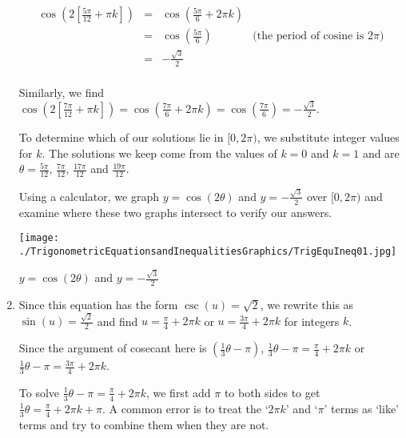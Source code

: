 \documentclass{ximera}
\begin{document}
\begin{example}
\begin{enumerate}
\[ \begin{array}{rclr}

\cos\left( 2\left[\frac{5\pi}{12} + \pi k\right]\right) &  = &  \cos\left(\frac{5\pi}{6} + 2\pi k\right) & \\ [3pt]
																												& =  &   \cos\left(\frac{5\pi}{6}\right) & \text{(the period of cosine is $2\pi$)} \\ [3pt]
																												& =  & -\frac{\sqrt{3}}{2} & \\
\end{array}\] 

Similarly, we find $\cos\left( 2\left[\frac{7\pi}{12} + \pi k\right]\right) = \cos\left(\frac{7\pi}{6} + 2\pi k\right) = \cos\left(\frac{7\pi}{6}\right) = -\frac{\sqrt{3}}{2}$.  

\smallskip

To determine which of our solutions lie in $[0,2\pi)$, we substitute integer values for $k$.  The solutions we keep come from the values of $k = 0$ and $k =1$ and are  $\theta = \frac{5\pi}{12}$,  $\frac{7\pi}{12}$, $\frac{17\pi}{12}$ and $\frac{19\pi}{12}$.  

\smallskip

Using a calculator, we graph $y = \cos(2\theta)$ and $y = -\frac{\sqrt{3}}{2}$ over $[0,2\pi)$ and examine where these two graphs intersect to verify our answers.

\begin{center}

\texttt{[image: ./TrigonometricEquationsandInequalitiesGraphics/TrigEquIneq01.jpg]}

{\boldmath $y = \cos(2\theta)$} and $y=-\frac{\sqrt{3}}{2}$

\end{center}


\item  Since this equation has the form $\csc(u) = \sqrt{2}$, we rewrite this as $\sin(u) = \frac{\sqrt{2}}{2}$ and find $u = \frac{\pi}{4} + 2\pi k$ or $u = \frac{3\pi}{4} + 2\pi  k$ for integers $k$.  

\smallskip

Since the argument of cosecant here is $\left(\frac{1}{3}\theta-\pi \right)$,  $\frac{1}{3}\theta-\pi = \frac{\pi}{4} + 2\pi k$ or $\frac{1}{3}\theta - \pi = \frac{3\pi}{4} + 2\pi k$.

\smallskip

To solve $\frac{1}{3} \theta-\pi = \frac{\pi}{4} + 2\pi k$, we first add $\pi$ to both sides to get  $\frac{1}{3} \theta = \frac{\pi}{4} + 2\pi k + \pi$. A common error is to treat the `$2\pi k$' and `$\pi$' terms as `like' terms and try to combine them when they are not.  


\end{enumerate}
\end{example}
\end{document}
